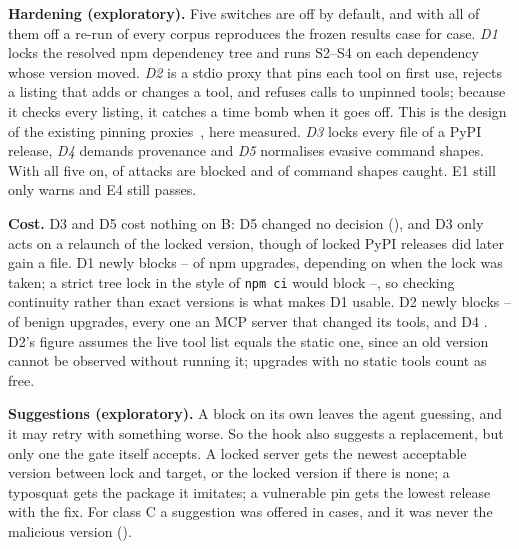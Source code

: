 \documentclass[conference]{IEEEtran}
\newcommand{\code}[1]{\texttt{#1}}
\begin{document}
\textbf{Hardening (exploratory).} Five switches are off by default, and with all of them off a re-run of every corpus
reproduces the frozen results case for case. \emph{D1} locks the resolved npm dependency tree and runs S2--S4 on each
dependency whose version moved. \emph{D2} is a stdio proxy that pins each tool on first use, rejects a listing that adds
or changes a tool, and refuses calls to unpinned tools; because it checks every listing, it catches a time bomb when it
goes off. This is the design of the existing pinning proxies~\cite{mcppin,mcpseal}, here measured. \emph{D3} locks every
file of a PyPI release, \emph{D4} demands provenance and \emph{D5} normalises evasive command shapes. With all five on,
\EAllBlock{} of \ENCases{} attacks are blocked and \EElevenH{} of \EElevenN{} command shapes caught. E1 still only warns
and E4 still passes.

\textbf{Cost.} D3 and D5 cost nothing on B: D5 changed no decision (\HFive), and D3 only acts on a relaunch of the locked
version, though \HThreeLateP{} of locked PyPI releases did later gain a file. D1 newly blocks
\HOneBlockLateP--\HOneBlockEarlyP{} of npm upgrades, depending on when the lock was taken; a strict tree lock in the
style of \code{npm ci} would block \HOneStrictLateP--\HOneStrictEarlyP, so checking continuity rather than exact
versions is what makes D1 usable. D2 newly blocks \HTwoAddLoP--\HTwoAddHiP{} of benign upgrades, every one an MCP server
that changed its tools, and D4 \HFourAddP. D2's figure assumes the live tool list equals the static one, since an old
version cannot be observed without running it; \HTwoUnmeas{} upgrades with no static tools count as free.

\textbf{Suggestions (exploratory).} A block on its own leaves the agent guessing, and it may retry with something
worse. So the hook also suggests a replacement, but only one the gate itself accepts. A locked server gets the newest
acceptable version between lock and target, or the locked version if there is none; a typosquat gets the package it
imitates; a vulnerable pin gets the lowest release with the fix. For class C a
suggestion was offered in \SgRMCCov{} cases, and it was never the malicious version (\SgRMCBad).



\end{document}

